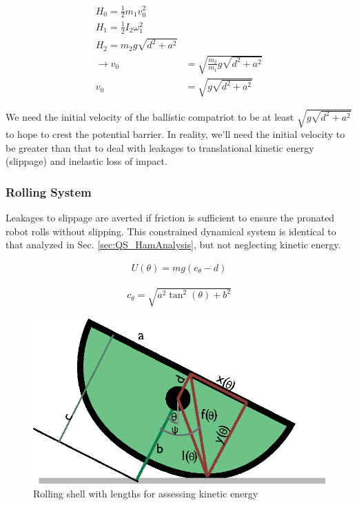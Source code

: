 \documentclass[letterpaper, 10 pt, conference]{ieeeconf}
\begin{document}
\begin{align}
H_0 = \frac{1}{2} m_1 v_0^2  \\
H_1 = \frac{1}{2} I_2 \omega_1^2  \\
H_2 = m_2 g \sqrt{d^2+a^2} \\
\rightarrow v_0 &= \sqrt{\frac{m_2}{m_1}g \sqrt{d^2+a^2}} \\
 v_0 &= \sqrt{g \sqrt{d^2+a^2}}
\end{align}

We need the initial velocity of the ballistic compatriot to be at least $\sqrt{g \sqrt{d^2+a^2}}$ to hope to crest the potential barrier.
In reality, we'll need the initial velocity to be greater than that to deal with leakages to translational kinetic energy (slippage) and inelastic loss of impact.

\subsubsection{Rolling System} %
Leakages to slippage are averted if friction is sufficient to ensure the pronated robot rolls without slipping.
This constrained dynamical system is identical to that analyzed in Sec. \ref{sec:QS_HamAnalysis}, but not neglecting kinetic energy.

\begin{align}
  U(\theta) = mg(c_\theta - d)
\end{align}

\begin{align}
  c_\theta = \sqrt{a^2 \tan^2(\theta) + b^2}
\end{align}

\begin{figure}
  \centering
  \includegraphics[width=\columnwidth]{Dyn_EnergyAnalysis.eps}
  \caption{Rolling shell with lengths for assessing kinetic energy}
\end{figure}
\end{document}
